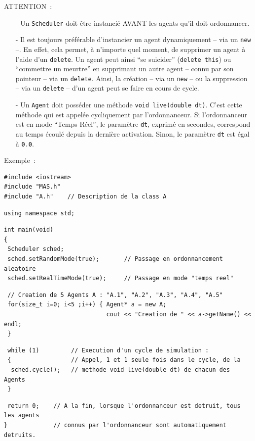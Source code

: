 \documentclass[12pt]{article}
\begin{document}
\vspace{-0.2cm}
ATTENTION~:
\begin{itemize}
\vspace{-0.1cm}
\item[-] Un {\tt Scheduler} doit \^etre instanci\'e AVANT les agents qu'il doit
ordonnancer.
\vspace{-0.2cm}
\item[-] Il est toujours pr\'ef\'erable d'instancier un agent dynamiquement
-- via un {\tt new} --.
En effet, cela permet, \`a n'importe quel moment, de supprimer un agent
\`a l'aide d'un {\tt delete}.
Un agent peut ainsi ``se suicider'' ({\tt delete this})
ou ``commettre un meurtre'' en supprimant un autre agent -- connu par son
pointeur --  via un {\tt delete}.
Ainsi, la cr\'eation -- via un {\tt new} -- ou
la suppression -- via un {\tt delete} -- d'un agent peut se faire en cours
de cycle.
\vspace{-0.2cm}
\item[-] Un {\tt Agent} doit poss\'eder une m\'ethode
{\tt void live(double dt)}.
C'est cette m\'ethode qui est appel\'ee cycliquement par l'ordonnanceur.
Si l'ordonnanceur est en mode ``Temps R\'eel'', le param\`etre {\tt dt},
exprim\'e en secondes, correspond au temps \'ecoul\'e depuis la derni\`ere
activation. Sinon, le param\`etre {\tt dt} est \'egal \`a {\tt 0.0}.
\end{itemize}

\vspace{0.1cm}

Exemple~:
\begin{footnotesize}
\label{premierEx}
\begin{verbatim}
#include <iostream>
#include "MAS.h" 
#include "A.h"    // Description de la class A
\end{verbatim}
\begin{verbatim}
using namespace std;
\end{verbatim}
\begin{verbatim}
int main(void)
{
 Scheduler sched;
 sched.setRandomMode(true);       // Passage en ordonnancement aleatoire
 sched.setRealTimeMode(true);     // Passage en mode "temps reel"
\end{verbatim}
\begin{verbatim}
 // Creation de 5 Agents A : "A.1", "A.2", "A.3", "A.4", "A.5"
 for(size_t i=0; i<5 ;i++) { Agent* a = new A;
                             cout << "Creation de " << a->getName() << endl;
 }
\end{verbatim}
\begin{verbatim}
 while (1)         // Execution d'un cycle de simulation :
 {                 // Appel, 1 et 1 seule fois dans le cycle, de la
  sched.cycle();   // methode void live(double dt) de chacun des Agents
 }
\end{verbatim}
\begin{verbatim}
 return 0;    // A la fin, lorsque l'ordonnanceur est detruit, tous les agents
}             // connus par l'ordonnanceur sont automatiquement detruits.
\end{verbatim}
\end{footnotesize}
\end{document}
